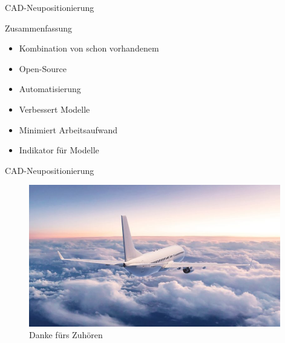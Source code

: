 \begin{frame}{CAD-Neupositionierung}
    \begin{block}{Zusammenfassung}
        \begin{itemize}
            \item Kombination von schon vorhandenem
            \item Open-Source
            \item Automatisierung
            \item Verbessert Modelle
            \item Minimiert Arbeitsaufwand
            \item Indikator für Modelle
        \end{itemize}
    \end{block}
\end{frame}

\begin{frame}{CAD-Neupositionierung}
\begin{figure}
    \centering
    \includegraphics[height=175pt]{img_niklas/end_frame.jpg}
    \caption*{Danke fürs Zuhören}
    \label{fig:my_label}
\end{figure}

\end{frame}